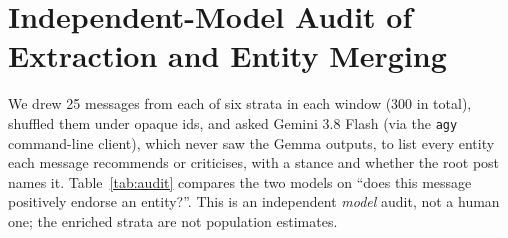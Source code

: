 \documentclass[10pt]{article}
\begin{document}
\section{Independent-Model Audit of Extraction and Entity Merging}\label{app:audit}
We drew 25 messages from each of six strata in each window (300 in total), shuffled them under opaque ids, and asked Gemini 3.8 Flash (via the \texttt{agy} command-line client), which never saw the Gemma outputs, to list every entity each message recommends or criticises, with a stance and whether the root post names it. Table~\ref{tab:audit} compares the two models on ``does this message positively endorse an entity?''. This is an independent \emph{model} audit, not a human one; the enriched strata are not population estimates.
\begin{table}[h]
\centering\small
{}
\caption{Blind audit of the Gemma extractor by Gemini 3.8 Flash.}
\label{tab:audit}
\end{table}
\end{document}
